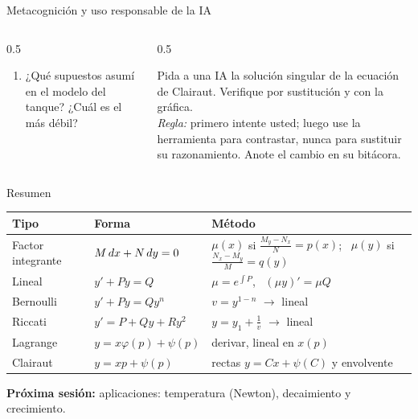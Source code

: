 \documentclass[10pt,aspectratio=169]{beamer}
\begin{document}
\begin{frame}{Metacognición y uso responsable de la IA}
  \small
  \begin{columns}[t]
    \begin{column}{0.5\textwidth}
      \begin{metacog}
        \begin{enumerate}
          \metacomun
          \item ¿Qué supuestos asumí en el modelo del tanque? ¿Cuál es el más débil?
        \end{enumerate}
      \end{metacog}
    \end{column}
    \begin{column}{0.5\textwidth}
      \begin{iabox}
        Pida a una IA la solución singular de la ecuación de Clairaut. Verifique por sustitución y con la gráfica.\\[2pt]
        \textit{Regla:} primero intente usted; luego use la herramienta para contrastar, nunca para sustituir su razonamiento. Anote el cambio en su bitácora.
      \end{iabox}
    \end{column}
  \end{columns}
\end{frame}

\begin{frame}{Resumen}
  \renewcommand{\arraystretch}{1.5}
  \begin{tabular}{l|l|l}
    \textbf{Tipo} & \textbf{Forma} & \textbf{Método}\\ \hline
    Factor integrante & $M\,dx+N\,dy=0$ & $\mu(x)$ si $\frac{M_y-N_x}N=p(x)$; \ $\mu(y)$ si $\frac{N_x-M_y}M=q(y)$\\
    Lineal & $y'+Py=Q$ & $\mu=e^{\int P}$, \ $(\mu y)'=\mu Q$\\
    Bernoulli & $y'+Py=Qy^n$ & $v=y^{1-n}$ $\to$ lineal\\
    Riccati & $y'=P+Qy+Ry^2$ & $y=y_1+\frac1v$ $\to$ lineal\\
    Lagrange & $y=x\varphi(p)+\psi(p)$ & derivar, lineal en $x(p)$\\
    Clairaut & $y=xp+\psi(p)$ & rectas $y=Cx+\psi(C)$ y envolvente
  \end{tabular}
  \vspace{3mm}

  \textbf{Próxima sesión:} aplicaciones: temperatura (Newton), decaimiento y crecimiento.
\end{frame}
\end{document}
